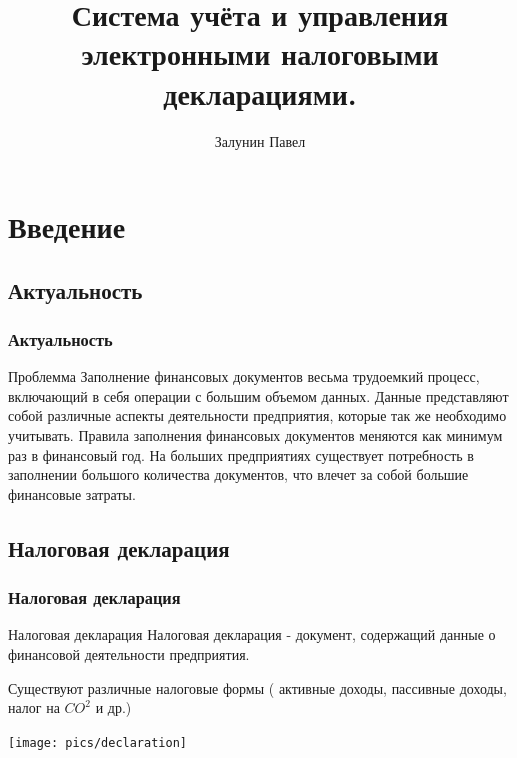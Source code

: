 \documentclass[xcolor=pdftex, dvipsnames, table]{beamer}
\title{Система учёта и управления электронными налоговыми декларациями.}
\author{Залунин Павел}
\institute {
  БГУИР\\
  ФИТУ
}
\begin{document}
\frame{\titlepage}

\section[Outline]{}
\frame{\tableofcontents}

\section{Введение}
\subsection{Актуальность}
\begin{frame}
  \frametitle{Актуальность}
  \begin{block}{Проблемма}
    Заполнение финансовых документов весьма трудоемкий процесс, включающий в себя операции с большим объемом данных. Данные представляют собой различные аспекты деятельности предприятия, которые так же необходимо учитывать. Правила заполнения финансовых документов меняются как минимум раз в финансовый год. На больших предприятиях существует потребность в заполнении большого количества документов, что влечет за собой большие финансовые затраты.
  \end{block}
\end{frame}

\subsection{Налоговая декларация}
\begin{frame}
  \frametitle{Налоговая декларация}
  \begin{block}{Налоговая декларация}
    Налоговая декларация - документ, содержащий данные о финансовой деятельности предприятия.


Существуют различные налоговые формы ( активные доходы, пассивные доходы, налог на $CO^{2}$ и др.)
  \end{block}
  \begin{center}
    \texttt{[image: pics/declaration]}
  \end{center}
\end{frame}
\end{document}
